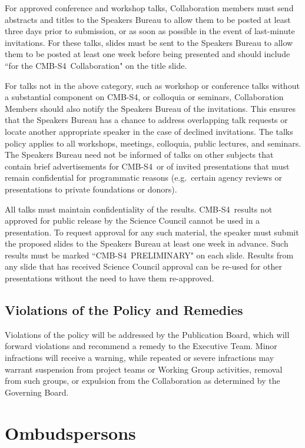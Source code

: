 \documentclass[12pt]{article}
\newcommand\collabname{CMB-S4}
\begin{document}
For approved conference and workshop talks, Collaboration members must send abstracts and titles to the Speakers Bureau to allow them to be posted at least three days prior to submission, or as soon as possible in the event of last-minute invitations. For these talks, slides must be sent to the Speakers Bureau to allow them to be posted at least one week before being presented and should include ``for the \collabname\ Collaboration" on the title slide.

For talks not in the above category, such as workshop or conference talks without a substantial component on \collabname, or colloquia or seminars, Collaboration Members should also notify the Speakers Bureau of the invitations. This ensures that the Speakers Bureau has a chance to address overlapping talk requests or locate another appropriate speaker in the case of declined invitations.  The talks policy applies to all workshops, meetings, colloquia, public lectures, and seminars.  The Speakers Bureau need not be informed of talks on other subjects that contain brief advertisements for \collabname\  or of invited presentations that must remain confidential for programmatic reasons (e.g.~certain agency reviews or presentations to private foundations or donors).

All talks must maintain confidentiality of the results. \collabname\ results not approved for public release by the Science Council cannot be used in a presentation. To request approval for any such material, the speaker must submit the proposed slides to the Speakers Bureau at least one week in advance. Such results must be marked ``\collabname\ PRELIMINARY" on each slide. Results from any slide that has received Science Council approval can be re-used for other presentations without the need to have them re-approved.

\subsection{Violations of the Policy and Remedies}

Violations of the policy will be addressed by the Publication Board, which will forward violations and recommend a remedy to the Executive Team.  Minor infractions will receive a warning, while repeated or severe infractions may warrant suspension from project teams or Working Group activities, removal from such groups, or expulsion from the Collaboration as determined by the Governing Board.

\section{Ombudspersons}
\end{document}
